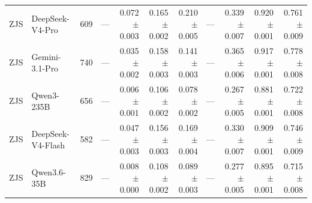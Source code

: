 \begin{table}[t]
{\begin{tabular}{llrrrrrrrrr}
ZJS & DeepSeek-V4-Pro & 609 & --- & \shortstack[r]{0.072\\{\scriptsize $\pm$0.003}} & \shortstack[r]{0.165\\{\scriptsize $\pm$0.002}} & \shortstack[r]{0.210\\{\scriptsize $\pm$0.005}} & --- & \shortstack[r]{0.339\\{\scriptsize $\pm$0.007}} & \shortstack[r]{0.920\\{\scriptsize $\pm$0.001}} & \shortstack[r]{0.761\\{\scriptsize $\pm$0.009}} \\
ZJS & Gemini-3.1-Pro & 740 & --- & \shortstack[r]{0.035\\{\scriptsize $\pm$0.002}} & \shortstack[r]{0.158\\{\scriptsize $\pm$0.003}} & \shortstack[r]{0.141\\{\scriptsize $\pm$0.003}} & --- & \shortstack[r]{0.365\\{\scriptsize $\pm$0.006}} & \shortstack[r]{0.917\\{\scriptsize $\pm$0.001}} & \shortstack[r]{0.778\\{\scriptsize $\pm$0.008}} \\
ZJS & Qwen3-235B & 656 & --- & \shortstack[r]{0.006\\{\scriptsize $\pm$0.001}} & \shortstack[r]{0.106\\{\scriptsize $\pm$0.002}} & \shortstack[r]{0.078\\{\scriptsize $\pm$0.002}} & --- & \shortstack[r]{0.267\\{\scriptsize $\pm$0.005}} & \shortstack[r]{0.881\\{\scriptsize $\pm$0.001}} & \shortstack[r]{0.722\\{\scriptsize $\pm$0.008}} \\
ZJS & DeepSeek-V4-Flash & 582 & --- & \shortstack[r]{0.047\\{\scriptsize $\pm$0.003}} & \shortstack[r]{0.156\\{\scriptsize $\pm$0.003}} & \shortstack[r]{0.169\\{\scriptsize $\pm$0.004}} & --- & \shortstack[r]{0.330\\{\scriptsize $\pm$0.007}} & \shortstack[r]{0.909\\{\scriptsize $\pm$0.001}} & \shortstack[r]{0.746\\{\scriptsize $\pm$0.009}} \\
ZJS & Qwen3.6-35B & 829 & --- & \shortstack[r]{0.008\\{\scriptsize $\pm$0.000}} & \shortstack[r]{0.108\\{\scriptsize $\pm$0.002}} & \shortstack[r]{0.089\\{\scriptsize $\pm$0.003}} & --- & \shortstack[r]{0.277\\{\scriptsize $\pm$0.005}} & \shortstack[r]{0.895\\{\scriptsize $\pm$0.001}} & \shortstack[r]{0.715\\{\scriptsize $\pm$0.008}} \\

\end{tabular}}
\end{table}
